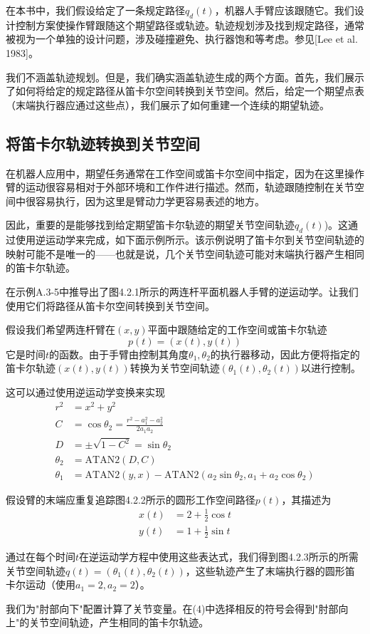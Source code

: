 \documentclass[UTF8]{ctexart}
\theoremstyle{definition}
\newcommand{\ATAN}{\mathrm{ATAN2}}
\begin{document}
在本书中，我们假设给定了一条规定路径$q_d(t)$，机器人手臂应该跟随它。我们设计控制方案使操作臂跟随这个期望路径或轨迹。轨迹规划涉及找到规定路径，通常被视为一个单独的设计问题，涉及碰撞避免、执行器饱和等考虑。参见[Lee et al. 1983]。

我们不涵盖轨迹规划。但是，我们确实涵盖轨迹生成的两个方面。首先，我们展示了如何将给定的规定路径从笛卡尔空间转换到关节空间。然后，给定一个期望点表（末端执行器应通过这些点），我们展示了如何重建一个连续的期望轨迹。

\subsection{将笛卡尔轨迹转换到关节空间}

在机器人应用中，期望任务通常在工作空间或笛卡尔空间中指定，因为在这里操作臂的运动很容易相对于外部环境和工作件进行描述。然而，轨迹跟随控制在关节空间中很容易执行，因为这里是臂动力学更容易表述的地方。

因此，重要的是能够找到给定期望笛卡尔轨迹的期望关节空间轨迹$q_d(t)$)。这通过使用逆运动学来完成，如下面示例所示。该示例说明了笛卡尔到关节空间轨迹的映射可能不是唯一的——也就是说，几个关节空间轨迹可能对末端执行器产生相同的笛卡尔轨迹。

\begin{examplebox}[示例4.2-1：将规定笛卡尔轨迹映射到关节空间]
在示例A.3-5中推导出了图4.2.1所示的两连杆平面机器人手臂的逆运动学。让我们使用它们将路径从笛卡尔空间转换到关节空间。

假设我们希望两连杆臂在$(x, y)$平面中跟随给定的工作空间或笛卡尔轨迹
\begin{equation}
    p(t) = (x(t), y(t))
\end{equation}
它是时间$t$的函数。由于手臂由控制其角度$\theta_1, \theta_2$的执行器移动，因此方便将指定的笛卡尔轨迹$(x(t), y(t))$转换为关节空间轨迹$(\theta_1(t), \theta_2(t))$以进行控制。

这可以通过使用逆运动学变换来实现
\begin{align}
    r^2 &= x^2 + y^2 \\
    C &= \cos\theta_2 = \frac{r^2 - a_1^2 - a_2^2}{2a_1a_2} \\
    D &= \pm\sqrt{1 - C^2} = \sin\theta_2 \\
    \theta_2 &= \ATAN(D, C) \\
    \theta_1 &= \ATAN(y, x) - \ATAN(a_2\sin\theta_2, a_1 + a_2\cos\theta_2)
\end{align}

假设臂的末端应重复追踪图4.2.2所示的圆形工作空间路径$p(t)$，其描述为
\begin{align}
    x(t) &= 2 + \frac{1}{2}\cos t \\
    y(t) &= 1 + \frac{1}{2}\sin t
\end{align}

通过在每个时间$t$在逆运动学方程中使用这些表达式，我们得到图4.2.3所示的所需关节空间轨迹$q(t) = (\theta_1(t), \theta_2(t))$，这些轨迹产生了末端执行器的圆形笛卡尔运动（使用$a_1 = 2, a_2 = 2$）。

我们为"肘部向下"配置计算了关节变量。在(4)中选择相反的符号会得到"肘部向上"的关节空间轨迹，产生相同的笛卡尔轨迹。
\end{examplebox}
\end{document}
